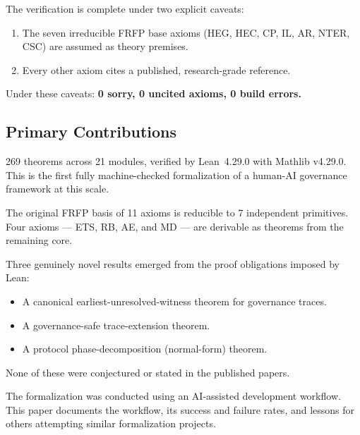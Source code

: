 The verification is complete under two explicit caveats:
\begin{enumerate}
  \item The seven irreducible FRFP base axioms (HEG, HEC, CP, IL, AR, NTER, CSC)
        are assumed as theory premises.
  \item Every other axiom cites a published, research-grade reference.
\end{enumerate}

Under these caveats: \textbf{0 sorry, 0 uncited axioms, 0 build errors.}

\subsection{Primary Contributions}

\begin{contribution}
269 theorems across 21 modules, verified by Lean~4.29.0 with Mathlib v4.29.0.
This is the first fully machine-checked formalization of a human-AI governance
framework at this scale.
\end{contribution}

\begin{contribution}
The original FRFP basis of 11 axioms is reducible to 7 independent primitives.
Four axioms --- ETS, RB, AE, and MD --- are derivable as theorems from the
remaining core.
\end{contribution}

\begin{contribution}
Three genuinely novel results emerged from the proof obligations imposed by Lean:
\begin{itemize}
  \item A canonical earliest-unresolved-witness theorem for governance traces.
  \item A governance-safe trace-extension theorem.
  \item A protocol phase-decomposition (normal-form) theorem.
\end{itemize}
None of these were conjectured or stated in the published papers.
\end{contribution}

\begin{contribution}
The formalization was conducted using an AI-assisted development workflow. This
paper documents the workflow, its success and failure rates, and lessons for
others attempting similar formalization projects.
\end{contribution}

